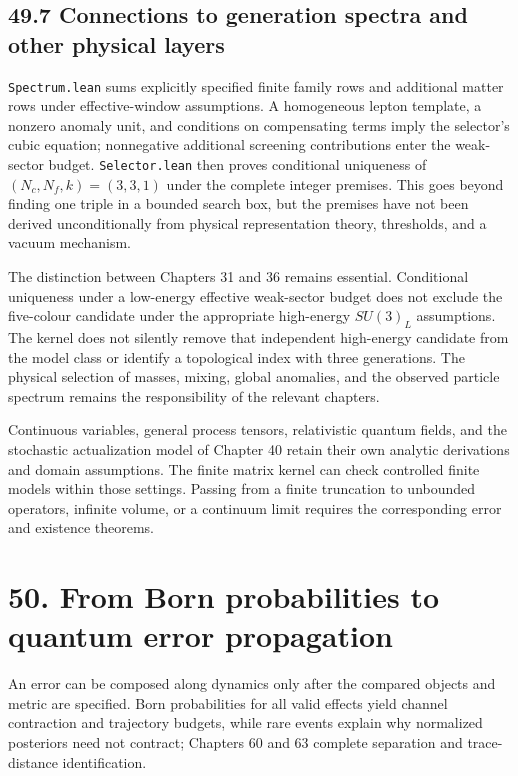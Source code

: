 \documentclass[
  11pt,
  oneside]{book}
\begin{document}
\section{49.7 Connections to generation spectra and other physical
layers}

\texttt{Spectrum.\allowbreak lean} sums explicitly specified finite family rows and
additional matter rows under effective-window assumptions. A homogeneous
lepton template, a nonzero anomaly unit, and conditions on compensating
terms imply the selector's cubic equation; nonnegative additional
screening contributions enter the weak-sector budget.
\texttt{Selector.\allowbreak lean} then proves conditional uniqueness of
\((N_c,N_f,k)=(3,3,1)\) under the complete integer premises. This goes
beyond finding one triple in a bounded search box, but the premises have
not been derived unconditionally from physical representation theory,
thresholds, and a vacuum mechanism.

The distinction between Chapters 31 and 36 remains essential.
Conditional uniqueness under a low-energy effective weak-sector budget
does not exclude the five-colour candidate under the appropriate
high-energy \(SU(3)_L\) assumptions. The kernel does not silently remove
that independent high-energy candidate from the model class or identify
a topological index with three generations. The physical selection of
masses, mixing, global anomalies, and the observed particle spectrum
remains the responsibility of the relevant chapters.

Continuous variables, general process tensors, relativistic quantum
fields, and the stochastic actualization model of Chapter 40 retain
their own analytic derivations and domain assumptions. The finite matrix
kernel can check controlled finite models within those settings. Passing
from a finite truncation to unbounded operators, infinite volume, or a
continuum limit requires the corresponding error and existence theorems.

\chapter{50. From Born probabilities to quantum error
propagation}\label{ch-50}

An error can be composed along dynamics only after the compared objects
and metric are specified. Born probabilities for all valid effects yield
channel contraction and trajectory budgets, while rare events explain
why normalized posteriors need not contract; Chapters 60 and 63 complete
separation and trace-distance identification.
\end{document}
